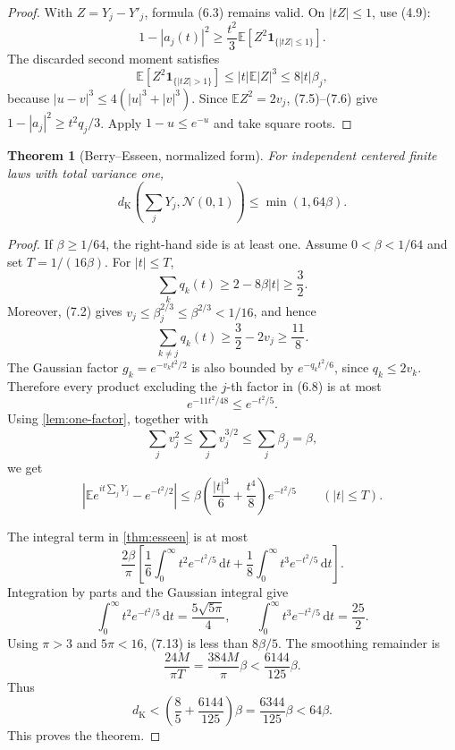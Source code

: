 \documentclass[11pt]{article}
\newtheorem{theorem}{Theorem}[section]
\newcommand{\E}{\mathbb E}
\newcommand{\dd}{\,\mathrm d}
\newcommand{\ind}{\mathbf 1}
\newcommand{\dk}{d_{\mathrm K}}
\newcommand{\abs}[1]{\left|#1\right|}
\begin{document}
\begin{proof}
With \(Z=Y_j-Y'_j\), formula (6.3) remains valid.  On \(|tZ|\le1\), use
(4.9):
\[
 1-|a_j(t)|^2
 \ge\frac{t^2}{3}\E[Z^2\ind_{\{|tZ|\le1\}}].        \tag{7.5}
\]
The discarded second moment satisfies
\[
 \E[Z^2\ind_{\{|tZ|>1\}}]
 \le |t|\E|Z|^3
 \le8|t|\beta_j,                                      \tag{7.6}
\]
because \(|u-v|^3\le4(|u|^3+|v|^3)\).  Since
\(\E Z^2=2v_j\), (7.5)--(7.6) give
\(1-|a_j|^2\ge t^2q_j/3\).  Apply \(1-u\le e^{-u}\)
and take square roots.
\end{proof}

\begin{theorem}[Berry--Esseen, normalized form]\label{thm:be-normalized}
For independent centered finite laws with total variance one,
\[
 \dk\!\left(\sum_jY_j,\mathcal N(0,1)\right)
 \le\min(1,64\beta).                                  \tag{7.7}
\]
\end{theorem}

\begin{proof}
If \(\beta\ge1/64\), the right-hand side is at least one.  Assume
\(0<\beta<1/64\) and set \(T=1/(16\beta)\).  For \(|t|\le T\),
\[
 \sum_kq_k(t)\ge2-8\beta|t|\ge\frac32.                \tag{7.8}
\]
Moreover, (7.2) gives
\(v_j\le\beta_j^{2/3}\le\beta^{2/3}<1/16\), and hence
\[
 \sum_{k\ne j}q_k(t)\ge\frac32-2v_j\ge\frac{11}{8}. \tag{7.9}
\]
The Gaussian factor \(g_k=e^{-v_kt^2/2}\) is also bounded by
\(e^{-q_kt^2/6}\), since \(q_k\le2v_k\).  Therefore every product
excluding the \(j\)-th factor in (6.8) is at most
\[
 e^{-11t^2/48}\le e^{-t^2/5}.                         \tag{7.10}
\]
Using \cref{lem:one-factor}, together with
\[
 \sum_jv_j^2\le\sum_jv_j^{3/2}\le\sum_j\beta_j=\beta,\tag{7.11}
\]
we get
\[
 \abs{\E e^{it\sum_jY_j}-e^{-t^2/2}}
 \le\beta\left(\frac{|t|^3}{6}+\frac{t^4}{8}\right)e^{-t^2/5}
 \qquad(|t|\le T).                                    \tag{7.12}
\]

The integral term in \cref{thm:esseen} is at most
\[
 \frac{2\beta}{\pi}
 \left[
  \frac16\int_0^\infty t^2e^{-t^2/5}\dd t
 +\frac18\int_0^\infty t^3e^{-t^2/5}\dd t
 \right].                                              \tag{7.13}
\]
Integration by parts and the Gaussian integral give
\[
 \int_0^\infty t^2e^{-t^2/5}\dd t=\frac{5\sqrt{5\pi}}4,
 \qquad
 \int_0^\infty t^3e^{-t^2/5}\dd t=\frac{25}{2}.      \tag{7.14}
\]
Using \(\pi>3\) and \(5\pi<16\), (7.13) is less than
\(8\beta/5\).  The smoothing remainder is
\[
 \frac{24M}{\pi T}=\frac{384M}{\pi}\beta
 <\frac{6144}{125}\beta.                              \tag{7.15}
\]
Thus
\[
 \dk<\left(\frac85+\frac{6144}{125}\right)\beta
 =\frac{6344}{125}\beta<64\beta.                     \tag{7.16}
\]
This proves the theorem.
\end{proof}
\end{document}
